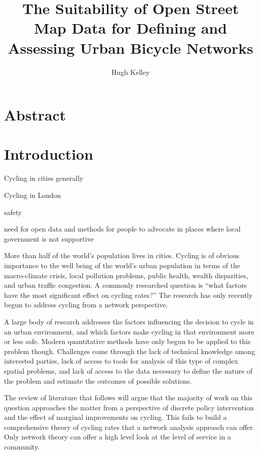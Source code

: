 \documentclass[11pt]{article} %
\title{The Suitability of Open Street Map Data for Defining and Assessing Urban Bicycle Networks}
\author{Hugh Kelley}
\begin{document}
\maketitle
\section{Abstract}

\tableofcontents

\listoftables

\section{Introduction}

Cycling in cities generally

Cycling in London

safety

need for open data and methods for people to advocate in places where local government is not supportive

More than half of the world's population lives in cities. Cycling is of obvious importance to the well being of the world's  urban population in terms of the macro-climate crisis, local pollution problems,  public health, wealth disparities, and urban traffic congestion. A commonly researched question is ``what factors have the most significant effect on cycling rates?'' The research has only recently begun to address cycling from a network perspective. 

A large body of research addresses the factors influencing the decision to cycle in an urban environment, and which factors make cycling in that environment more or less safe. Modern quantitative methods have only begun to be applied to this problem though. Challenges come through the lack of technical knowledge among interested parties, lack of access to tools for analysis of this type of complex spatial problems, and lack of access to the data necessary to define the nature of the problem and estimate the outcomes of possible solutions. 

 The review of literature that follows will argue that the majority of work on this question approaches the matter from a perspective of discrete policy intervention and the effect of marginal improvements on cycling. This fails to build a comprehensive theory of cycling rates that a network analysis approach can offer. Only network theory can offer a high level look at the level of service in a community. 
\end{document}
